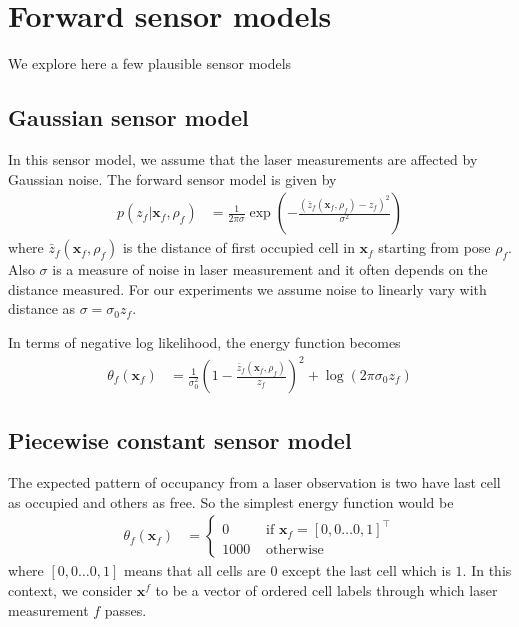 \documentclass[letterpaper, 10 pt, conference]{ieeeconf} %
\newcommand{\vect}[1]{\mathbf{#1}}
\begin{document}
\section{Forward sensor models}
We explore here a few plausible sensor models
\subsection{Gaussian sensor model}
\newcommand{\actz}{\bar{z}_f(\vect{x}_f, \rho_f)}
In this sensor model, we assume that the laser measurements are affected by Gaussian noise. The forward sensor model is given by
\begin{align}
  p(z_f|\vect{x}_f, \rho_f) &= \frac{1}{2\pi\sigma}\exp\left(-\frac{(\actz - z_f)^2}{\sigma^2}\right)
\end{align}
where $\actz$ is the distance of first occupied cell in $\vect{x}_f$ starting from pose $\rho_f$. Also $\sigma$ is a measure of noise in laser measurement and it often depends on the distance measured. For our experiments we assume noise to linearly vary with distance as $\sigma = \sigma_0z_f$. 

In terms of negative log likelihood, the energy function becomes
\begin{align}
  \theta_f(\vect{x}_f) &= \frac{1}{\sigma_0^2}\left(1 - \frac{\actz}{z_f}\right)^2 + \log(2\pi\sigma_0z_f)
\end{align}

\subsection{Piecewise constant sensor model}
The expected pattern of occupancy from a laser observation is two have last cell as occupied and others as free. So the simplest energy function would be 
\begin{align}
  \theta_f(\vect{x}_f) &= \begin{cases}
              0 & \text{ if } \vect{x}_f = [0, 0 \dots 0, 1]^\top\\
           1000 & \text{ otherwise}
  \end{cases}
\end{align}
where $[0, 0 \dots 0, 1]$ means that all cells are $0$ except the last cell which is $1$. In this context, we consider $\vect{x}^f$ to be a vector of ordered cell labels through which laser measurement $f$ passes.
\end{document}
